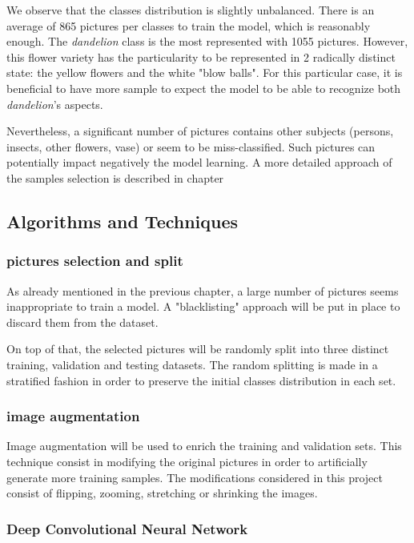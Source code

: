 We observe that the classes distribution is slightly unbalanced. There is an average of 865 pictures per classes to train the model, which is reasonably enough. The \textit{dandelion} class is the most represented with 1055 pictures. However, this flower variety has the particularity to be represented in 2 radically distinct state: the yellow flowers and the white "blow balls".
For this particular case, it is beneficial to have more sample to expect the model to be able to recognize both \textit{dandelion}'s aspects.  

Nevertheless, a significant number of pictures contains other subjects (persons, insects, other flowers, vase) or seem to be miss-classified. Such pictures can potentially impact negatively the model learning. A more detailed approach of the samples selection is described in chapter  

\subsection{Algorithms and Techniques}

\subsubsection{pictures selection and split }

As already mentioned in the previous chapter, a large number of pictures seems inappropriate to train a model. A "blacklisting" approach will be put in place to discard them from the dataset.

On top of that, the selected pictures will be randomly split into three distinct training, validation and testing datasets. The random splitting is made in a stratified fashion in order to preserve the initial classes distribution in each set.

\subsubsection{image augmentation}

Image augmentation will be used to enrich the training and validation sets. This technique consist in modifying the original pictures in order to artificially generate more training samples. The modifications considered in this project consist of flipping, zooming, stretching or shrinking the images.

\subsubsection{Deep Convolutional Neural Network}

